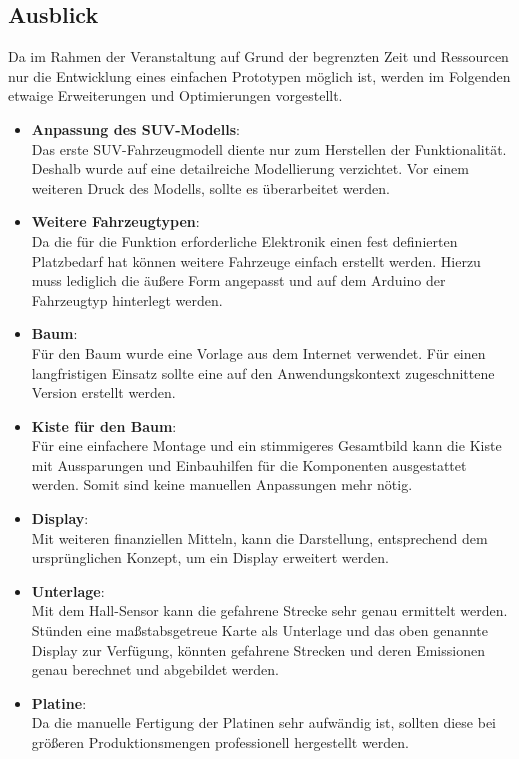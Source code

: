 \documentclass[.../Dokumentation.tex]{subfile}
\begin{document}
    \subsection{Ausblick}\label{sec-outlook}
   	Da im Rahmen der Veranstaltung auf Grund der begrenzten Zeit und Ressourcen nur die Entwicklung eines einfachen Prototypen möglich ist, werden im Folgenden etwaige Erweiterungen und Optimierungen vorgestellt.
   	\begin{itemize}
  		\item \textbf{Anpassung des SUV-Modells}:\\
  		Das erste SUV-Fahrzeugmodell diente nur zum Herstellen der Funktionalität. Deshalb wurde auf eine detailreiche Modellierung verzichtet. Vor einem weiteren Druck des Modells, sollte es überarbeitet werden.
   		\item \textbf{Weitere Fahrzeugtypen}:\\
   		Da die für die Funktion erforderliche Elektronik einen fest definierten Platzbedarf hat können weitere Fahrzeuge einfach erstellt werden. Hierzu muss lediglich die äußere Form angepasst und auf dem Arduino der Fahrzeugtyp hinterlegt werden. 
   		\item \textbf{Baum}:\\
   		Für den Baum wurde eine Vorlage aus dem Internet verwendet. Für einen langfristigen Einsatz sollte eine auf den Anwendungskontext zugeschnittene Version erstellt werden.
   		\item \textbf{Kiste für den Baum}:\\
   		Für eine einfachere Montage und ein stimmigeres Gesamtbild kann die Kiste mit Aussparungen und Einbauhilfen für die Komponenten ausgestattet werden. Somit sind keine manuellen Anpassungen mehr nötig.
   		\item \textbf{Display}:\\
   		Mit weiteren finanziellen Mitteln, kann die Darstellung, entsprechend dem ursprünglichen Konzept, um ein Display erweitert werden.
   		\item \textbf{Unterlage}:\\
   		Mit dem Hall-Sensor kann die gefahrene Strecke sehr genau ermittelt werden. Stünden eine maßstabsgetreue Karte als Unterlage und das oben genannte Display zur Verfügung, könnten gefahrene Strecken und deren Emissionen genau berechnet und abgebildet werden.
   		\item \textbf{Platine}:\\
   		Da die manuelle Fertigung der Platinen sehr aufwändig ist, sollten diese bei größeren Produktionsmengen professionell hergestellt werden.
   	\end{itemize}
   
\end{document}

